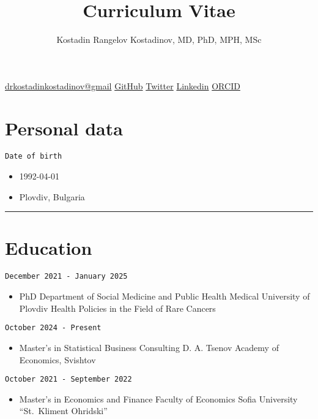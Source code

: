 \documentclass[
  12pt,
  letterpaper,
  DIV=11,
  numbers=noendperiod]{scrartcl}
\title{Curriculum Vitae}
\author{Kostadin Rangelov Kostadinov, MD, PhD, MPH, MSc}
\date{}
\providecommand{\tightlist}{%
  \setlength{\itemsep}{0pt}\setlength{\parskip}{0pt}}\usepackage{longtable,booktabs,array}
\begin{document}
\maketitle


\href{https://drkostadinkostadinov@gmail.com}{drkostadinkostadinov@gmail}
\textbar{} \href{https://github.com/kostadinoff}{GitHub} \textbar{}
\href{https://twitter.com/kostadinoffMD}{Twitter} \textbar{}
\href{https://linkedin.com/in/kostadinovmd}{Linkedin} \textbar{}
\href{https://orcid.org/0000-0003-1414-8738}{ORCID}

\section{Personal data}\label{personal-data}

\texttt{Date\ of\ birth}

\begin{itemize}
\tightlist
\item
  1992-04-01
\item
  Plovdiv, Bulgaria
\end{itemize}

\begin{center}\rule{0.5\linewidth}{0.5pt}\end{center}

\section{Education}\label{education}

\texttt{December\ 2021\ -\ January\ 2025}

\begin{itemize}
\tightlist
\item
  PhD \textbar{} Department of Social Medicine and Public Health
  \textbar{} Medical University of Plovdiv \textbar{} Health Policies in
  the Field of Rare Cancers
\end{itemize}

\texttt{October\ 2024\ -\ Present}

\begin{itemize}
\tightlist
\item
  Master's in Statistical Business Consulting \textbar{} D. A. Tsenov
  Academy of Economics, Svishtov
\end{itemize}

\texttt{October\ 2021\ -\ September\ 2022}

\begin{itemize}
\tightlist
\item
  Master's in Economics and Finance \textbar{} Faculty of Economics
  \textbar{} Sofia University ``St.~Kliment Ohridski''
\end{itemize}
\end{document}
